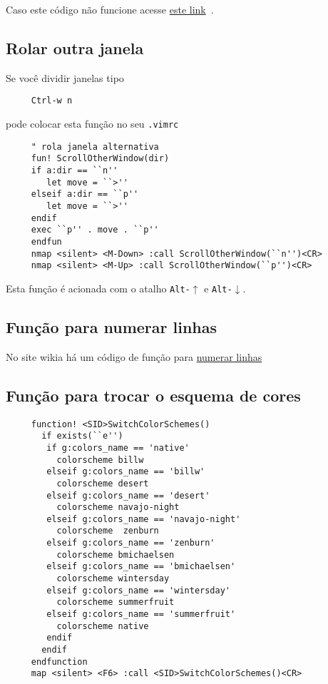 Caso este código não funcione acesse
\href{http://vim.wikia.com/wiki/Writing\_a\_valid\_statusline}{este
link}~\cite{StatusLine}.


\subsection{Rolar outra janela}\label{Rolar outra janela}

Se você dividir janelas tipo

\begin{verbatim}
     Ctrl-w n
\end{verbatim}

pode colocar esta função no seu \verb|.vimrc|

\begin{verbatim}
     " rola janela alternativa
     fun! ScrollOtherWindow(dir)
     if a:dir == ``n''
        let move = ``>''
     elseif a:dir == ``p''
        let move = ``>''
     endif
     exec ``p'' . move . ``p''
     endfun
     nmap <silent> <M-Down> :call ScrollOtherWindow(``n'')<CR>
     nmap <silent> <M-Up> :call ScrollOtherWindow(``p'')<CR>
\end{verbatim}

Esta função é acionada com o atalho {\tt Alt-$\uparrow$} e {\tt Alt-$\downarrow$}.

\subsection{Função para numerar linhas}\label{Função para numerar linhas}

No site wikia há um código de função para
\href{http://vim.wikia.com/wiki/Number\_a\_group\_of\_lines}{numerar
linhas}~\cite{NumerarLinhas}

\subsection{Função para trocar o esquema de cores}

\begin{verbatim}
     function! <SID>SwitchColorSchemes()
       if exists(``e'')
        if g:colors_name == 'native'
          colorscheme billw
        elseif g:colors_name == 'billw'
          colorscheme desert
        elseif g:colors_name == 'desert'
          colorscheme navajo-night
        elseif g:colors_name == 'navajo-night'
          colorscheme  zenburn
        elseif g:colors_name == 'zenburn'
          colorscheme bmichaelsen
        elseif g:colors_name == 'bmichaelsen'
          colorscheme wintersday
        elseif g:colors_name == 'wintersday'
          colorscheme summerfruit
        elseif g:colors_name == 'summerfruit'
          colorscheme native
        endif
       endif
     endfunction
     map <silent> <F6> :call <SID>SwitchColorSchemes()<CR>
\end{verbatim}

